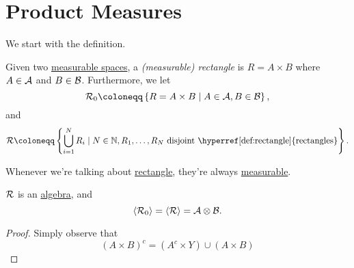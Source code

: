 \section{Product Measures}
We start with the definition.
\begin{definition}[Rectangle]\label{def:rectangle}
	Given two \hyperref[def:measurable-space]{measurable spaces}, a \emph{(measurable) rectangle} is \(R = A\times B\) where \(A\in \mathcal{\MakeUppercase{a}} \)
	and \(B\in \mathcal{\MakeUppercase{b}} \). Furthermore, we let
	\[
		\mathcal{\MakeUppercase{r}} _0 \coloneqq \left\{R = A\times B \mid A\in \mathcal{\MakeUppercase{a}} , B\in \mathcal{\MakeUppercase{b}} \right\},
	\]
	and
	\[
		\mathcal{\MakeUppercase{r}} \coloneqq \left\{\bigcup\limits_{i=1}^{N} R_{i} \mid N\in \mathbb{\MakeUppercase{n}} , R_1, \ldots , R_N \text{ disjoint \hyperref[def:rectangle]{rectangles}}\right\}.
	\]
\end{definition}
\begin{note}
	Whenever we're talking about \hyperref[def:rectangle]{rectangle}, they're always \hyperref[def:measurable-set]{measurable}.
\end{note}

\begin{lemma}
	\(\mathcal{\MakeUppercase{r}} \) is an \hyperref[def:algebra]{algebra}, and
	\[
		\left< \mathcal{\MakeUppercase{r}} _0 \right> = \left< \mathcal{\MakeUppercase{r}}  \right> = \mathcal{\MakeUppercase{a}} \otimes \mathcal{\MakeUppercase{b}}.
	\]
\end{lemma}
\begin{proof}
	Simply observe that
	\[
		(A\times B)^{c} = (A^{c} \times Y)\cup (A\times B)
	\]
\end{proof}